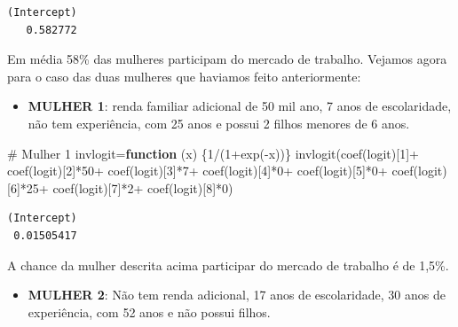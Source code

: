 \documentclass[
  letterpaper,
  DIV=11,
  numbers=noendperiod]{scrreprt}
\newenvironment{Shaded}{\begin{snugshade}}{\end{snugshade}}
\newcommand{\CommentTok}[1]{\textcolor[rgb]{0.37,0.37,0.37}{#1}}
\newcommand{\ControlFlowTok}[1]{\textcolor[rgb]{0.00,0.23,0.31}{\textbf{#1}}}
\newcommand{\DecValTok}[1]{\textcolor[rgb]{0.68,0.00,0.00}{#1}}
\newcommand{\FunctionTok}[1]{\textcolor[rgb]{0.28,0.35,0.67}{#1}}
\newcommand{\NormalTok}[1]{\textcolor[rgb]{0.00,0.23,0.31}{#1}}
\newcommand{\OtherTok}[1]{\textcolor[rgb]{0.00,0.23,0.31}{#1}}
\newcommand{\SpecialCharTok}[1]{\textcolor[rgb]{0.37,0.37,0.37}{#1}}
\providecommand{\tightlist}{%
  \setlength{\itemsep}{0pt}\setlength{\parskip}{0pt}}
\begin{document}
\begin{verbatim}
(Intercept) 
   0.582772 
\end{verbatim}

Em média 58\% das mulheres participam do mercado de trabalho. Vejamos
agora para o caso das duas mulheres que haviamos feito anteriormente:

\begin{itemize}
\tightlist
\item
  \textbf{MULHER 1}: renda familiar adicional de 50 mil ano, 7 anos de
  escolaridade, não tem experiência, com 25 anos e possui 2 filhos
  menores de 6 anos.
\end{itemize}

\begin{Shaded}
\begin{Highlighting}[]
\CommentTok{\# Mulher 1}
\NormalTok{invlogit}\OtherTok{=}\ControlFlowTok{function}\NormalTok{ (x) \{}\DecValTok{1}\SpecialCharTok{/}\NormalTok{(}\DecValTok{1}\SpecialCharTok{+}\FunctionTok{exp}\NormalTok{(}\SpecialCharTok{{-}}\NormalTok{x))\}}
\FunctionTok{invlogit}\NormalTok{(}\FunctionTok{coef}\NormalTok{(logit)[}\DecValTok{1}\NormalTok{]}\SpecialCharTok{+}
           \FunctionTok{coef}\NormalTok{(logit)[}\DecValTok{2}\NormalTok{]}\SpecialCharTok{*}\DecValTok{50}\SpecialCharTok{+}
           \FunctionTok{coef}\NormalTok{(logit)[}\DecValTok{3}\NormalTok{]}\SpecialCharTok{*}\DecValTok{7}\SpecialCharTok{+}
           \FunctionTok{coef}\NormalTok{(logit)[}\DecValTok{4}\NormalTok{]}\SpecialCharTok{*}\DecValTok{0}\SpecialCharTok{+}
           \FunctionTok{coef}\NormalTok{(logit)[}\DecValTok{5}\NormalTok{]}\SpecialCharTok{*}\DecValTok{0}\SpecialCharTok{+}
           \FunctionTok{coef}\NormalTok{(logit)[}\DecValTok{6}\NormalTok{]}\SpecialCharTok{*}\DecValTok{25}\SpecialCharTok{+}
           \FunctionTok{coef}\NormalTok{(logit)[}\DecValTok{7}\NormalTok{]}\SpecialCharTok{*}\DecValTok{2}\SpecialCharTok{+}
           \FunctionTok{coef}\NormalTok{(logit)[}\DecValTok{8}\NormalTok{]}\SpecialCharTok{*}\DecValTok{0}\NormalTok{)}
\end{Highlighting}
\end{Shaded}

\begin{verbatim}
(Intercept) 
 0.01505417 
\end{verbatim}

A chance da mulher descrita acima participar do mercado de trabalho é de
1,5\%.

\begin{itemize}
\tightlist
\item
  \textbf{MULHER 2}: Não tem renda adicional, 17 anos de escolaridade,
  30 anos de experiência, com 52 anos e não possui filhos.
\end{itemize}
\end{document}
